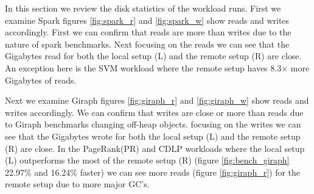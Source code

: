 \par In this section we review the disk statistics of the workload runs. First we examine Spark figures \ref{fig:spark_r} and \ref{fig:spark_w} show reads and writes accordingly. First we can confirm that reads are more than writes due to the nature of spark benchmarks. Next focusing on the reads we can see that the Gigabytes read for both the local setup (L) and the remote setup (R) are close. An exception here is the SVM workload where the remote setup haves 8.3× more Gigabytes of reads.
\par Next we examine Giraph figures \ref{fig:giraph_r} and \ref{fig:giraph_w} show reads and writes accordingly. We can confirm that writes are close or more than reads due to Giraph benchmarks changing off-heap objects. focusing on the writes we can see that the Gigabytes wrote for both the local setup (L) and the remote setup (R) are close. In the PageRank(PR)	and CDLP workloads where the local setup (L) outperforms the most of the remote setup (R) (figure \ref{fig:bench_giraph} 22.97\% and 16.24\% faster) we can see more reads (figure \ref{fig:giraph_r}) for the remote setup due to more major GC's.

